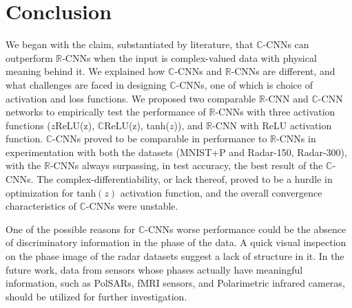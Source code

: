 \chapter{Conclusion} \label{chap:experiments}


We began with the claim, substantiated by literature, that $\mathbb{C}$-CNNs can outperform $\mathbb{R}$-CNNs when the input is complex-valued data with physical meaning behind it. We explained how $\mathbb{C}$-CNNs and $\mathbb{R}$-CNNs are different, and what challenges are faced in designing $\mathbb{C}$-CNNs, one of which is choice of activation and loss functions. We proposed two comparable $\mathbb{R}$-CNN and $\mathbb{C}$-CNN networks to empirically test the performance of $\mathbb{R}$-CNNs with three activation functions ($z$ReLU(z), $\mathbb{C}$ReLU(z), tanh($z$)), and $\mathbb{R}$-CNN with ReLU activation function. $\mathbb{C}$-CNNs proved to be comparable in performance to $\mathbb{R}$-CNNs in experimentation with both the datasets (MNIST+P and Radar-150, Radar-300), with the $\mathbb{R}$-CNNs always surpassing, in test accuracy, the best result of the $\mathbb{C}$-CNNs. The complex-differentiability, or lack thereof, proved to be a hurdle in optimization for $\mathrm{tanh}(z)$ activation function, and the overall convergence characteristics of $\mathbb{C}$-CNNs were unstable. 

One of the possible reasons for $\mathbb{C}$-CNNs worse performance could be the absence of discriminatory information in the phase of the data. A quick visual inspection on the phase image of the radar datasets suggest a lack of structure in it. In the future work, data from sensors whose phases actually have meaningful information, such as PolSARs, fMRI sensors, and Polarimetric infrared cameras, should be utilized for further investigation.
